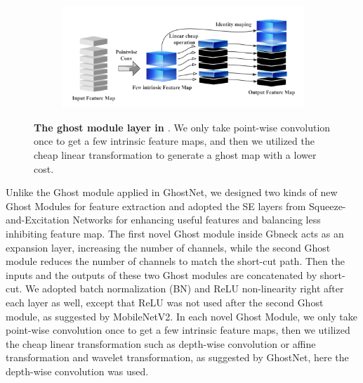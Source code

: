\begin{figure}[h]
	\begin{center}
		
		\begin{subfigure}[b]{\textwidth}
		    \centering
			\includegraphics[width=\textwidth]{thesis-template-master/images/ghostmodule.png}
			
			\label{fig:cellnet}
		\end{subfigure}
	\end{center}
	\caption{\textbf{The ghost module layer in \cite{19}}. We only take point-wise convolution once to get a few intrinsic feature maps, and then we utilized the cheap linear transformation to generate a ghost map with a lower cost.}
\end{figure}

Unlike the Ghost module applied in GhostNet\cite{19}, we designed two kinds of new Ghost Modules for feature extraction and adopted the SE layers from Squeeze-and-Excitation Networks \cite{24} for enhancing useful features and balancing less inhibiting feature map. The first novel Ghost module inside Gbneck acts as an expansion layer, increasing the number of channels, while the second Ghost module reduces the number of channels to match the short-cut path. Then the inputs and the outputs of these two Ghost modules are concatenated by short-cut. We adopted batch normalization (BN) and ReLU non-linearity right after each layer as well\cite{19}, except that ReLU was not used after the second Ghost module, as suggested by MobileNetV2\cite{30}. In each novel Ghost Module, we only take point-wise convolution once to get a few intrinsic feature maps, then we utilized the cheap linear transformation such as depth-wise convolution or affine transformation and wavelet transformation, as suggested by GhostNet\cite{19}, here the depth-wise convolution was used.

